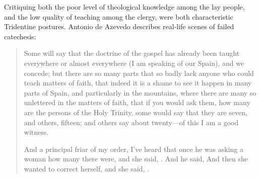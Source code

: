 Critiquing both the poor level of theological knowledge among the lay people, 
and the low quality of teaching among the clergy, were both characteristic 
Tridentine postures.%
    \Autocite[56-57]{Kamen:EarlyModernSociety}
Antonio de Azevedo describes real-life scenes of failed catechesis:
\begin{quotation}
    Some will say that the doctrine of the gospel has already been taught 
    everywhere or almost everywhere (I am speaking of our Spain), and we concede;
    but there are so many parts that so badly lack anyone who could teach 
    matters of faith,
    that indeed it is a shame to see it happen in many parts of Spain, and 
    particularly in the  mountains,
    where there are many so unlettered  in the matters 
    of faith,
    that if you would ask them, how many are the persons of the Holy Trinity, 
    some would say that they are seven, and others, fifteen; and others say about 
    twenty---of this I am a good witness.

    And a principal friar of my order, I've heard that once he was asking a 
    woman how many  there were, and she said, 
    .
    And he said, 
    And then she wanted to correct herself, and she said, .%
        \Autocite
        [26: .]
        {Azevedo:Catecismo}
\end{quotation}

